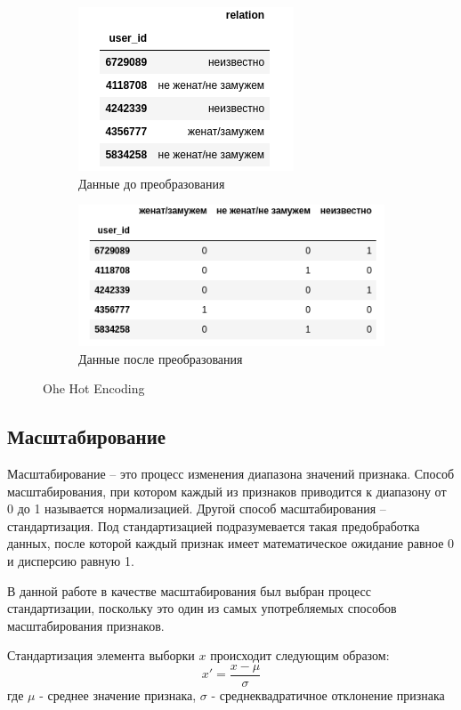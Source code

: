 \begin{figure}[h]
\begin{subfigure}[h]{0.4\linewidth}
\includegraphics[width=\linewidth]{images/ohe_example1.png}
\caption{Данные до преобразования}
\end{subfigure}
\hfill
\begin{subfigure}[h]{0.6\linewidth}
\includegraphics[width=\linewidth]{images/ohe_example2.png}
\caption{Данные после преобразования}
\end{subfigure}%
\caption{Ohe Hot Encoding}
\label{fig:ohe_example}
\end{figure}

\subsection*{Масштабирование}

Масштабирование -- это процесс изменения диапазона значений признака. Способ масштабирования, при котором каждый из признаков приводится к диапазону от 0 до 1 называется нормализацией. Другой способ масштабирования -- стандартизация. Под стандартизацией подразумевается такая предобработка данных, после которой каждый признак имеет математическое ожидание равное 0 и дисперсию равную 1.

В данной работе в качестве масштабирования был выбран процесс стандартизации, поскольку это один из самых употребляемых способов масштабирования признаков.

Стандартизация элемента выборки $x$ происходит следующим образом:
$$x' = \frac{x - \mu}{\sigma} $$
где $\mu$ - среднее значение признака, $\sigma$ - среднеквадратичное отклонение признака


\clearpage